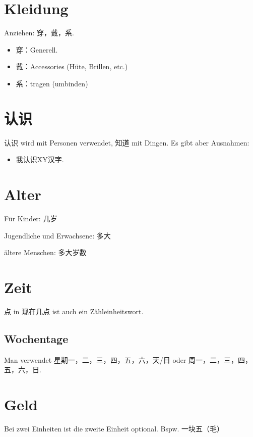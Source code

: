 \documentclass[UTF8]{ctexart}
\begin{document}
\section{Kleidung}

Anziehen: 穿，戴，系.

\begin{itemize}
    \item 穿：Generell.
    \item 戴：Accessories (Hüte, Brillen, etc.)
    \item 系：tragen (umbinden)
\end{itemize}

\section{认识}

认识 wird mit Personen verwendet, 知道 mit Dingen. Es gibt aber Ausnahmen:

\begin{itemize}
    \item 我认识XY汉字.
\end{itemize}

\section{Alter}

Für Kinder: 几岁

Jugendliche und Erwachsene: 多大

ältere Menschen: 多大岁数


\section{Zeit}

点 in 现在几点 ist auch ein Zähleinheitswort.

\subsection{Wochentage}

Man verwendet 星期{一，二，三，四，五，六，天/日} oder 周{一，二，三，四，五，六，日}.

\section{Geld}

Bei zwei Einheiten ist die zweite Einheit optional. Bspw. 一块五（毛）
\end{document}
